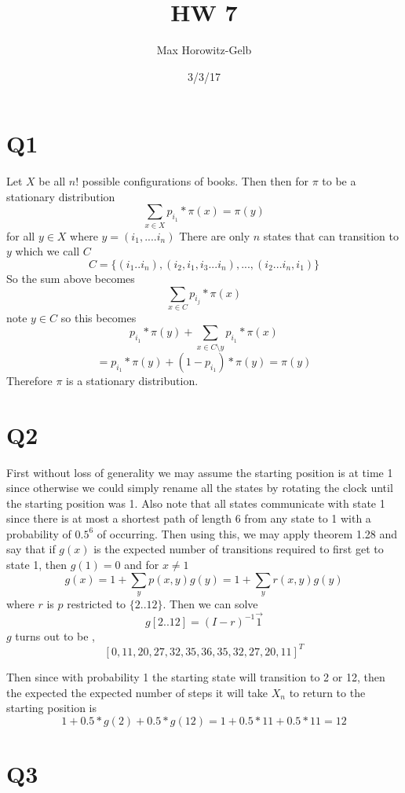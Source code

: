 \documentclass{article}
\title{HW 7}
\author{Max Horowitz-Gelb}
\date{3/3/17}
\begin{document}
\maketitle
\section*{Q1}
Let $X$ be all $n!$ possible configurations of books. 
Then then for $\pi$ to be a stationary distribution
\[
\sum_{x \in X} p_{i_1} * \pi(x) = \pi(y)
\]
for all $y \in X$ where $y = (i_1, ....i_n)$
There are only $n$ states that can transition to $y$ which we call $C$
\[
C = \{(i_1 .. i_n) , (i_2, i_1, i_3 ... i_n) , ... , (i_2 ... i_n, i_1)\}
\]
So the sum above becomes
\[
\sum_{x \in C} p_{i_j} * \pi(x) 
\]
note $y \in C$ so this becomes
\[
	p_{i_1}* \pi(y) + \sum_{x \in C \setminus y} p_{i_1} * \pi(x) 
\]
\[
	= p_{i_1} * \pi(y) + (1-p_{i_1})* \pi(y) = \pi(y)
\]
Therefore $\pi$ is a stationary distribution.
\section*{Q2}
First without loss of generality we may assume the starting position is at time 1 since otherwise we could simply rename all the states by rotating the clock until the starting position was 1. Also note that all states communicate with state 1 since there is at most a shortest path of length 6 from any state to 1 with a probability of $0.5^{6}$ of occurring.
Then using this, we may apply theorem 1.28 and say that
if $g(x)$ is the expected number of transitions required to first get to state 1, then
$g(1) = 0$ and for $x \neq 1$
\[
g(x) = 1 + \sum_y p(x,y)g(y) = 1 + \sum_y r(x,y)g(y)
\]
where $r$ is $p$ restricted to $\{2 .. 12\}$.
Then we can solve
\[
g[2 .. 12] = (I - r)^{-1} \vec{1}
\]
$g$ turns out to be ,
\[
[0, 11,  20,  27,  32,  35,  36,  35,  32,  27,  20,  11]^T
\]

Then since with probability 1 the starting state will transition to 2 or 12, then the expected the expected number of steps it will take $X_n$ to return to the starting position is
\[
1 + 0.5 * g(2) + 0.5 * g(12) = 1 + 0.5 * 11 + 0.5 * 11 = 12
\]

\section*{Q3}
\end{document}

